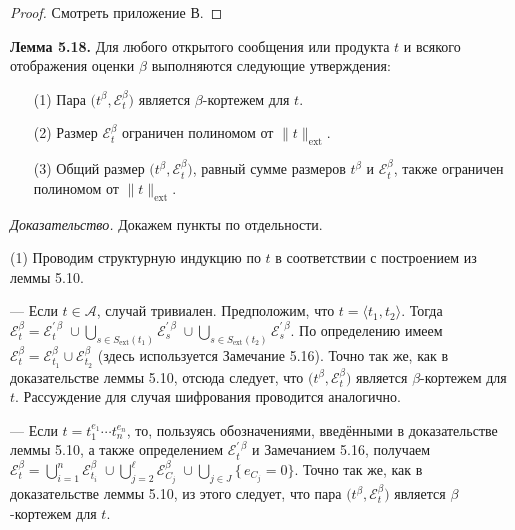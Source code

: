 \begin{proof}Смотреть приложение В.\end{proof}

\textbf{Лемма 5.18.}\;
Для любого открытого сообщения или продукта $t$ и всякого отображения оценки $\beta$ выполняются следующие утверждения:
\begin{enumerate}\itemsep0pt
\item[(1)] Пара $\bigl(t^{\beta},\mathcal E_{t}^{\beta}\bigr)$ является $\beta$-кортежем для $t$.
\item[(2)] Размер $\mathcal E_{t}^{\beta}$ ограничен полиномом от $\lVert t\rVert_{\text{ext}}$.
\item[(3)] Общий размер $\bigl(t^{\beta},\mathcal E_{t}^{\beta}\bigr)$, равный сумме размеров $t^{\beta}$ и $\mathcal E_{t}^{\beta}$, также ограничен полиномом от $\lVert t\rVert_{\text{ext}}$.
\end{enumerate}

\textit{Доказательство.}
Докажем пункты по отдельности.

\noindent(1)\; Проводим структурную индукцию по $t$ в соответствии с построением из леммы 5.10. \qedhere

— Если $t\in\mathcal A$, случай тривиален. Предположим, что  
  $t=\langle t_{1},t_{2}\rangle$. Тогда  
  \(
      \mathcal E_{t}^{\beta}
      =\mathcal E_{t}^{\prime\,\beta}
       \;\cup\!
       \bigcup_{s\in S_{\text{ext}}(t_{1})}\mathcal E_{s}^{\prime\,\beta}
       \;\cup\!
       \bigcup_{s\in S_{\text{ext}}(t_{2})}\mathcal E_{s}^{\prime\,\beta}.
  \)
  По определению имеем  
  \(
      \mathcal E_{t}^{\beta}
      =\mathcal E_{t_{1}}^{\beta}\cup\mathcal E_{t_{2}}^{\beta}
  \)
  (здесь используется Замечание 5.16).  
  Точно так же, как в доказательстве леммы 5.10, отсюда следует, что  
  $\bigl(t^{\beta},\mathcal E_{t}^{\beta}\bigr)$ является $\beta$-кортежем для $t$.  
  Рассуждение для случая шифрования проводится аналогично.

— Если \(t = t_{1}^{e_{1}}\!\cdots t_{n}^{e_{n}}\), то, пользуясь
  обозначениями, введёнными в доказательстве леммы 5.10,
  а также определением \(\mathcal E_{t}^{\prime\,\beta}\) и
  Замечанием 5.16, получаем
\(
   \mathcal E_{t}^{\beta}
     = \bigcup_{i=1}^{n}\mathcal E_{t_{i}}^{\beta}
       \;\cup\!
       \bigcup_{j=2}^{\ell}\mathcal E_{C_{j}}^{\beta}
       \;\cup\!
       \bigcup_{j\in J}\{\,e_{C_{j}} = 0\}.
\)
Точно так же, как в доказательстве леммы 5.10,
из этого следует, что пара \(\bigl(t^{\beta},\mathcal E_{t}^{\beta}\bigr)\)
является \(\beta\)-кортежем для \(t\).

